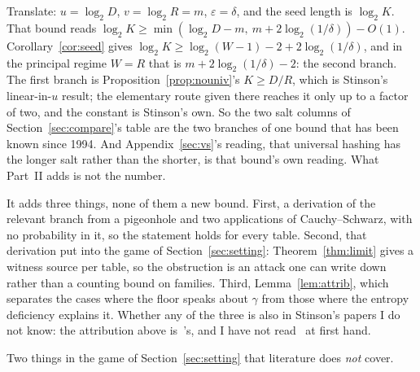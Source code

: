 \documentclass{aicr-solution}
\begin{document}
Translate: $u = \log_2 D$, $v = \log_2 R = m$, $\varepsilon = \delta$, and the seed length is
$\log_2 K$. That bound reads $\log_2 K \ge \min(\log_2 D - m,\ m + 2\log_2(1/\delta)) - O(1)$.
Corollary~\ref{cor:seed} gives $\log_2 K \ge \log_2(W-1) - 2 + 2\log_2(1/\delta)$, and in the
principal regime $W = R$ that is $m + 2\log_2(1/\delta) - 2$: the second branch. The first branch is
Proposition~\ref{prop:nouniv}'s $K \ge D/R$, which is Stinson's linear-in-$u$ result; the elementary
route given there reaches it only up to a factor of two, and the constant is Stinson's own. So the two salt columns of Section~\ref{sec:compare}'s table are the two branches of one bound
that has been known since 1994. And Appendix~\ref{sec:vs}'s reading, that universal hashing has the
longer salt rather than the shorter, is that bound's own reading. What Part~II adds is not the
number.

It adds three things, none of them a new bound. First, a derivation of the relevant branch from a
pigeonhole and two applications of Cauchy--Schwarz, with no probability in it, so the statement
holds for every table. Second, that derivation put into the game of Section~\ref{sec:setting}:
Theorem~\ref{thm:limit} gives a witness source per table, so the obstruction is an attack one can
write down rather than a counting bound on families. Third, Lemma~\ref{lem:attrib}, which separates
the cases where the floor speaks about $\gamma$ from those where the entropy deficiency explains it.
Whether any of the three is also in Stinson's papers I do not know: the attribution above
is~\cite{BDKPPSY11}'s, and I have not read~\cite{Sti94} at first hand.

Two things in the game of Section~\ref{sec:setting} that literature does \emph{not} cover.
\end{document}
